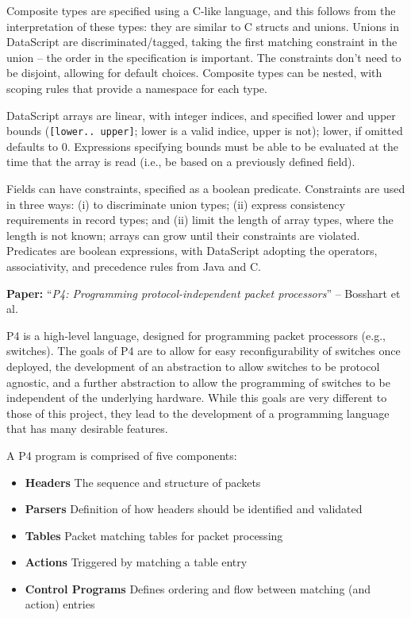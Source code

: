\documentclass[10pt,a4paper]{article}
\newcommand{\paper}[3]{\vspace{4mm}\noindent\textbf{Paper:} ``\textit{#1}'' -- #2 \cite{#3}\vspace{3mm}}
\begin{document}
Composite types are specified using a C-like language, and this follows from the
interpretation of these types: they are similar to C structs and unions. Unions in
DataScript are discriminated/tagged, taking the first matching constraint in the union --
the order in the specification is important. The constraints don't need to be disjoint,
allowing for default choices. Composite types can be nested, with scoping rules that
provide a namespace for each type.

DataScript arrays are linear, with integer indices, and specified lower and upper
bounds (\texttt{[lower.. upper]}; lower is a valid indice, upper is not); lower, if
omitted defaults to 0. Expressions specifying bounds must be able to be evaluated at the
time that the array is read (i.e., be based on a previously defined field). 

Fields can have constraints, specified as a boolean predicate. Constraints are used in
three ways: (i) to discriminate union types; (ii) express consistency requirements in
record types; and (ii) limit the length of array types, where the length is not known;
arrays can grow until their constraints are violated. Predicates are boolean expressions,
with DataScript adopting the operators, associativity, and precedence rules from Java and
C. 

\paper{P4: Programming protocol-independent packet processors}{Bosshart et al.}{bosshart2014p4}

P4 is a high-level language, designed for programming packet processors (e.g., switches).
The goals of P4 are to allow for easy reconfigurability of switches once deployed,
the development of an abstraction to allow switches to be protocol agnostic, and a further
abstraction to allow the programming of switches to be independent of the underlying
hardware. While this goals are very different to those of this project, they lead to the
development of a programming language that has many desirable features.

A P4 program is comprised of five components:
\begin{itemize}
\item \textbf{Headers} The sequence and structure of packets
\item \textbf{Parsers} Definition of how headers should be identified and validated
\item \textbf{Tables} Packet matching tables for packet processing
\item \textbf{Actions} Triggered by matching a table entry
\item \textbf{Control Programs} Defines ordering and flow between matching (and action) entries
\end{itemize}
\end{document}
